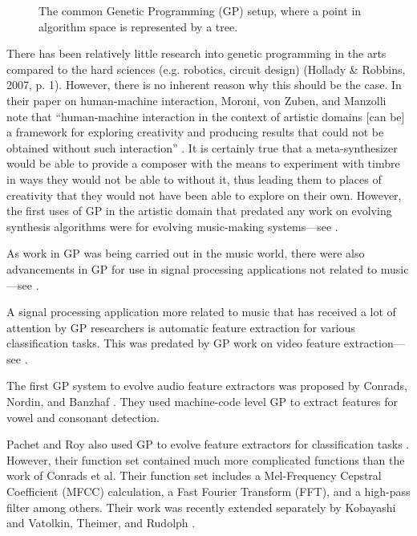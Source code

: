 \documentclass[a4paper,12pt]{report} 	%
\numberwithin{figure}{chapter}
\numberwithin{table}{chapter}
\numberwithin{equation}{chapter}
\begin{document}
\begin{flushleft}
\begin{figure}[h!]
\begin{center}
\caption[The Genetic Programming Paradigm]{The common Genetic Programming (GP) setup, where a point in algorithm space is represented by a tree.}
\end{center}
\end{figure}
There has been relatively little research into genetic programming in the arts compared to the hard sciences (e.g. robotics, circuit design) (Hollady \& Robbins, 2007, p. 1). However, there is no inherent reason why this should be the case. In their paper on human-machine interaction, Moroni, von Zuben, and Manzolli note that ``human-machine interaction in the context of artistic domains [can be] a framework for exploring creativity and producing results that could not be obtained without such interaction'' \cite[p. 185]{Moroni:2002oa}. It is certainly true that a meta-synthesizer would be able to provide a composer with the means to experiment with timbre in ways they would not be able to without it, thus leading them to places of creativity that they would not have been able to explore on their own. However, the first uses of GP in the artistic domain that predated any work on evolving synthesis algorithms were for evolving music-making systems---see \cite{Rowe:NoRead, Spector:1994ij, Johanson:1997gf, Polito:1997ly, Todd:1998tg, Costelloe:2007bv}.

As work in GP was being carried out in the music world, there were also advancements in GP for use in signal processing applications not related to music---see \cite{Sharman:1995bs, Alcazar:1997ve, Koza:1997zr, Miller:1998zr, Uesaka:2000jw, Holladay:2007ct}.

A signal processing application more related to music that has received a lot of attention by GP researchers is automatic feature extraction for various classification tasks. This was predated by GP work on video feature extraction---see \cite{Harris:1997qf, Teller:1998ly}. 

The first GP system to evolve audio feature extractors was proposed by Conrads, Nordin, and Banzhaf \cite{Conrads:1998wb}. They used machine-code level GP to extract features for vowel and consonant detection. 

Pachet and Roy also used GP to evolve feature extractors for classification tasks \cite{Pachet:2007if}. However, their function set contained much more complicated functions than the work of Conrads et al. Their function set includes a Mel-Frequency Cepstral Coefficient (MFCC) calculation, a Fast Fourier Transform (FFT), and a high-pass filter among others. Their work was recently extended separately by Kobayashi and Vatolkin, Theimer, and Rudolph \cite{Kobayashi:2009la, Vatolkin:2009bd}.


\end{flushleft}
\end{document}
